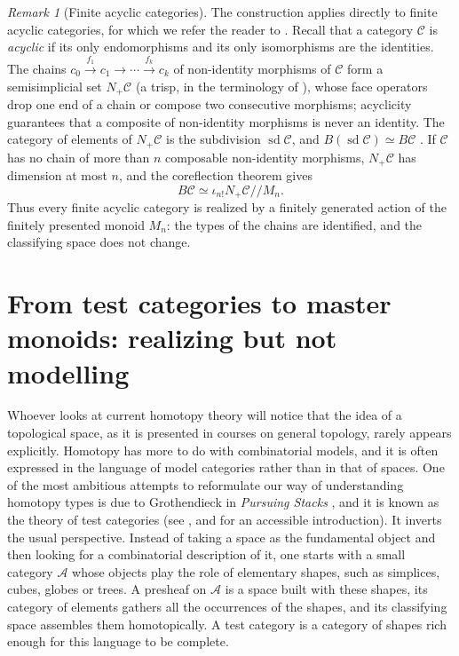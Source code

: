 \documentclass[11pt]{amsart}
\theoremstyle{definition}
\theoremstyle{remark}
\newtheorem{remark}[teo]{Remark}
\numberwithin{figure}{section}%
\newcommand{\CC}{\mathcal{C}}
\DeclareMathOperator{\sd}{sd}
\newcommand{\A}{\mathcal{A}}
\begin{document}
\begin{remark}[Finite acyclic categories]
\label{rem:acyclic}
The construction applies directly to finite acyclic categories, for which we refer the reader to \cite[Chapter~10]{Kozlov2008}. Recall that a category $\CC$ is \emph{acyclic} if its only endomorphisms and its only isomorphisms are the identities. The chains $c_0\xrightarrow{f_1}c_1\to\cdots\xrightarrow{f_k}c_k$ of non-identity morphisms of $\CC$ form a semisimplicial set $N_+\CC$ (a trisp, in the terminology of \cite[Chapter~10]{Kozlov2008}), whose face operators drop one end of a chain or compose two consecutive morphisms; acyclicity guarantees that a composite of non-identity morphisms is never an identity. The category of elements of $N_+\CC$ is the subdivision $\sd\CC$, and $B(\sd\CC)\simeq B\CC$ \cite{delHoyo2008}. If $\CC$ has no chain of more than $n$ composable non-identity morphisms, $N_+\CC$ has dimension at most $n$, and the coreflection theorem gives
\[
B\CC\simeq\iota_{n!}N_+\CC/\!/M_n .
\]
Thus every finite acyclic category is realized by a finitely generated action of the finitely presented monoid $M_n$: the types of the chains are identified, and the classifying space does not change.
\end{remark}

\section{From test categories to master monoids: realizing but not modelling}
\label{sec:test-categories-master-monoids}

Whoever looks at current homotopy theory will notice that the idea of a topological space, as it is presented in courses on general topology, rarely appears explicitly. Homotopy has more to do with combinatorial models, and it is often expressed in the language of model categories rather than in that of spaces. One of the most ambitious attempts to reformulate our way of understanding homotopy types is due to Grothendieck in \emph{Pursuing Stacks} \cite{PS}, and it is known as the theory of test categories (see \cite{Malt,Cis}, and \cite{zawadowski_kapulkin_test_categories} for an accessible introduction). It inverts the usual perspective. Instead of taking a space as the fundamental object and then looking for a combinatorial description of it, one starts with a small category $\A$ whose objects play the role of elementary shapes, such as simplices, cubes, globes or trees. A presheaf on $\A$ is a space built with these shapes, its category of elements gathers all the occurrences of the shapes, and its classifying space assembles them homotopically. A test category is a category of shapes rich enough for this language to be complete.
\end{document}
